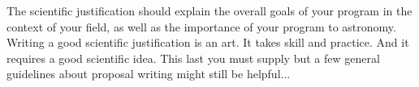 \documentclass[11pt]{article}
\begin{document}




%

%


\sciencejustification
The scientific justification should explain the overall goals of
your program in the context of your field, as well as the importance
of your program to astronomy.
Writing a good scientific justification is an art.  It takes
skill and practice.  And it requires a good scientific idea.
This last you must supply but a few general guidelines
about proposal writing might still be helpful...
\end{document}

